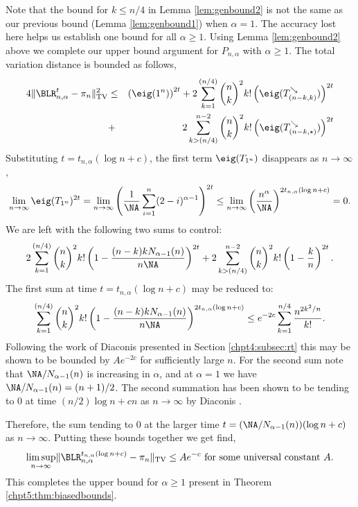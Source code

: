 \documentclass[11pt]{report}
\begin{document}
Note that the  bound for $k\leq n/4$ in Lemma \ref{lem:genbound2}  is not the same as our previous bound (Lemma \ref{lem:genbound1}) when $\alpha=1$. The accuracy 
lost here helps us establish one bound for all 
$\alpha \geq 1$. Using Lemma \ref{lem:genbound2} above we complete our upper 
bound argument for $P_{n,\alpha}$ with $\alpha\geq1$. The total variation 
distance is bounded as follows,
\begin{eqnarray*}
	4\lVert \BLR_{n,\alpha}^{t} - \pi_{n} \rVert^{2}_{\textnormal{TV}} 
	& \leq & 
	\left(\eig(1^{n})\right)^{2t} + 2\sum_{k=1}^{(n/4)} 
	{n\choose k}^{2} k!
	\left(\eig(T_{(n-k,k)}^{\searrow})\right)^{2t}\\
	& + &
	2\sum_{k>(n/4)}^{n-2} {n\choose k}^{2} k!
	\left(\eig(T_{(n-k,\star)}^{\searrow})\right)^{2t}
\end{eqnarray*}
Substituting $t=t_{n,\alpha}(\log n +  c)$, the first term $\eig(T_{1^{n}})$ disappears as $n\to\infty$,
\[\lim_{n\to\infty} \eig(T_{1^{n}})^{2t} = \lim_{n\to\infty} \left(\frac{1}{\NA} \sum_{i=1}^{n} (2-i)^{\alpha-1} \right)^{2t} \leq \lim_{n\to\infty} \left( \frac{n^{\alpha}}{\NA}\right)^{2t_{n,\alpha}(\log n + c)} = 0.\]
We are left with the following two sums to control:
\begin{eqnarray*}
	2\sum_{k=1}^{(n/4)} 
	{n\choose k}^{2} k!
	\left(1 - 
	\frac{(n-k)kN_{\alpha-1}(n)}{ n\NA}\right)^{2t} + 
	2\sum_{k>(n/4)}^{n-2} {n\choose k}^{2} k!
	\left( 1 - 
	\frac{k}{n}\right)^{2t}.
\end{eqnarray*}
The first sum at time $t = t_{n,\alpha}(\log n +c)$ may be reduced to:
\[\sum_{k=1}^{(n/4)} 
{n\choose k}^{2} k!
\left(1 - 
\frac{(n-k)kN_{\alpha-1}(n)}{ n\NA}\right)^{2t_{n,\alpha}(\log n + c)} \leq e^{-2c}\sum_{k=1}^{n/4}   \frac{n^{2k^{2}/n}}{k!}.\]
Following the work of Diaconis presented in Section \ref{chpt4:subsec:rt} this may be	shown to be bounded by $Ae^{-2c}$ for sufficiently large $n$. 
For the second sum note 
that $\NA/N_{\alpha-1}(n)$ is increasing in $\alpha$, and at $\alpha=1$ we have $\NA/N_{\alpha-1}(n) = (n+1)/2$. The second summation has been shown to be tending to $0$ at time $(n/2)\log n + cn$ as $n\to \infty$ by Diaconis \cite[Chapter 3D Theorem 5]{Diaconis1988}.

Therefore, the sum tending to $0$ at the larger time $t = (\NA/N_{\alpha-1}(n))(\log n  +  c)$ as $n\to\infty$. Putting these bounds together we get find,
\[\limsup_{n\to \infty} \lVert \BLR_{n,\alpha}^{t_{n,\alpha}(\log n  + c)} - \pi_{n} \rVert_{\tiny \textnormal{TV}} \leq Ae^{-c} \textnormal{ for some universal constant $A$} .\]
This completes the upper bound for $\alpha \geq 1$ present in Theorem \ref{chpt5:thm:biasedbounds}.
\end{document}

